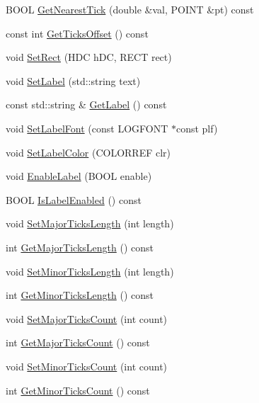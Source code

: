\begin{DoxyCompactItemize}
\item 
B\-O\-O\-L \hyperlink{class_axis_af51a2bb9da1f6c7e66134f39a22230bf}{Get\-Nearest\-Tick} (double \&val, P\-O\-I\-N\-T \&pt) const 
\item 
const int \hyperlink{class_axis_afa1b9b35e0561aeb36160c9ac1a2cdd9}{Get\-Ticks\-Offset} () const 
\item 
void \hyperlink{class_axis_a9430cb1b9468318b6c05a1c525d74fee}{Set\-Rect} (H\-D\-C h\-D\-C, R\-E\-C\-T rect)
\item 
void \hyperlink{class_axis_a381310504b09d64757c6575ac7cc2568}{Set\-Label} (std\-::string text)
\item 
const std\-::string \& \hyperlink{class_axis_a50eb89d6c720ecaac77d169454b12ed3}{Get\-Label} () const 
\item 
void \hyperlink{class_axis_aa99167d49da06387caa9ce3f53a41b83}{Set\-Label\-Font} (const L\-O\-G\-F\-O\-N\-T $\ast$const plf)
\item 
void \hyperlink{class_axis_adcc942ad32c71008b7f489f235a7a045}{Set\-Label\-Color} (C\-O\-L\-O\-R\-R\-E\-F clr)
\item 
void \hyperlink{class_axis_a6845dc4a3ab9bc86d8a26e195dad3bb6}{Enable\-Label} (B\-O\-O\-L enable)
\item 
B\-O\-O\-L \hyperlink{class_axis_a62b2e2157e201529baeab644300e4086}{Is\-Label\-Enabled} () const 
\item 
void \hyperlink{class_axis_ac82ca2f6125fd9842fc966472b30451b}{Set\-Major\-Ticks\-Length} (int length)
\item 
int \hyperlink{class_axis_a2bdab5744cb822411a9d7b98bea2ebd9}{Get\-Major\-Ticks\-Length} () const 
\item 
void \hyperlink{class_axis_af7612d81af3d140aef6d2c1560f308a7}{Set\-Minor\-Ticks\-Length} (int length)
\item 
int \hyperlink{class_axis_a2b383e7848e4d9284f0b37fcc55c1a5d}{Get\-Minor\-Ticks\-Length} () const 
\item 
void \hyperlink{class_axis_a59d9701163a36d83d19bd8723ced15c0}{Set\-Major\-Ticks\-Count} (int count)
\item 
int \hyperlink{class_axis_a5b56804af56f19924afb2fdaa5002a5e}{Get\-Major\-Ticks\-Count} () const 
\item 
void \hyperlink{class_axis_aaff875d18713ea68dea6375852814a34}{Set\-Minor\-Ticks\-Count} (int count)
\item 
int \hyperlink{class_axis_a8b4b13b1a23c57eb38e195460ecefafc}{Get\-Minor\-Ticks\-Count} () const 
\item 

\end{DoxyCompactItemize}
